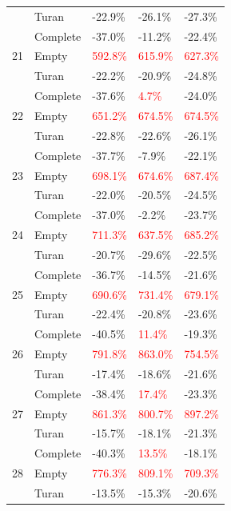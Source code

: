 \documentclass[12pt,a4paper]{article}
\begin{document}
\begin{longtable}{|l||l|l|l|l|}
  & Turan & -22.9\% & -26.1\% & -27.3\% \\
  & Complete & -37.0\% & -11.2\% & -22.4\% \\
  \hline
  21 & Empty & \textcolor{red}{592.8\%} & \textcolor{red}{615.9\%} & \textcolor{red}{627.3\%} \\
  & Turan & -22.2\% & -20.9\% & -24.8\% \\
  & Complete & -37.6\% & \textcolor{red}{4.7\%} & -24.0\% \\
  \hline
  22 & Empty & \textcolor{red}{651.2\%} & \textcolor{red}{674.5\%} & \textcolor{red}{674.5\%} \\
  & Turan & -22.8\% & -22.6\% & -26.1\% \\
  & Complete & -37.7\% & -7.9\% & -22.1\% \\
  \hline
  23 & Empty & \textcolor{red}{698.1\%} & \textcolor{red}{674.6\%} & \textcolor{red}{687.4\%} \\
  & Turan & -22.0\% & -20.5\% & -24.5\% \\
  & Complete & -37.0\% & -2.2\% & -23.7\% \\
  \hline
  24 & Empty & \textcolor{red}{711.3\%} & \textcolor{red}{637.5\%} & \textcolor{red}{685.2\%} \\
  & Turan & -20.7\% & -29.6\% & -22.5\% \\
  & Complete & -36.7\% & -14.5\% & -21.6\% \\
  \hline
  25 & Empty & \textcolor{red}{690.6\%} & \textcolor{red}{731.4\%} & \textcolor{red}{679.1\%} \\
  & Turan & -22.4\% & -20.8\% & -23.6\% \\
  & Complete & -40.5\% & \textcolor{red}{11.4\%} & -19.3\% \\
  \hline
  26 & Empty & \textcolor{red}{791.8\%} & \textcolor{red}{863.0\%} & \textcolor{red}{754.5\%} \\
  & Turan & -17.4\% & -18.6\% & -21.6\% \\
  & Complete & -38.4\% & \textcolor{red}{17.4\%} & -23.3\% \\
  \hline
  27 & Empty & \textcolor{red}{861.3\%} & \textcolor{red}{800.7\%} & \textcolor{red}{897.2\%} \\
  & Turan & -15.7\% & -18.1\% & -21.3\% \\
  & Complete & -40.3\% & \textcolor{red}{13.5\%} & -18.1\% \\
  \hline
  28 & Empty & \textcolor{red}{776.3\%} & \textcolor{red}{809.1\%} & \textcolor{red}{709.3\%} \\
  & Turan & -13.5\% & -15.3\% & -20.6\% \\

\end{longtable}
\end{document}
